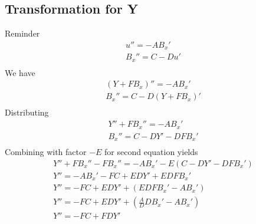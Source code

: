\documentclass[11pt]{article}
\begin{document}
\subsection{Transformation for Y}
Reminder
\begin{equation}\begin{aligned}
u''   = - A B_x' \\
B_x'' = C - D u' \\
\end{aligned} \end{equation}
We have
\begin{equation}\begin{aligned}
(Y + F B_x)''   = - A B_x' \\
B_x'' = C - D (Y + F B_x)' \\
\end{aligned} \end{equation}
Distributing
\begin{equation}\begin{aligned}
Y'' + F B_x''   = - A B_x' \\
B_x'' = C - D Y' - D F B_x' \\
\end{aligned} \end{equation}
Combining with factor $-E$ for second equation yields
\begin{equation}\begin{aligned}
Y'' + F B_x'' - FB_x''   = - A B_x' - E(C - D Y' - D F B_x') \\
Y'' = - A B_x' - FC + E D Y' + E D F B_x' \\
Y'' = - FC + E D Y' + (E D F B_x' - A B_x') \\
Y'' = - FC + E D Y' + \left(\frac{A}{D} D B_x' - A B_x' \right) \\
Y'' = - FC + F D Y' \\
\end{aligned} \end{equation}
\end{document}
